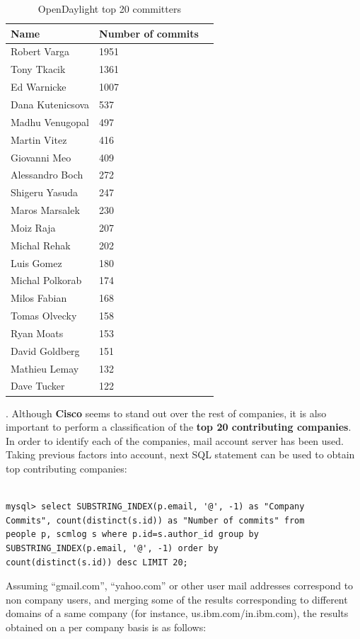 \documentclass[a4paper, 12pt]{book}
\begin{document}
\begin{table}[H]
\footnotesize
\begin{center}
\begin{tabular}{|l|l|p{3cm}|}
\hline
\textbf{Name}     & \textbf{Number of commits} \\ \hline
 Robert Varga     & 1951 \\ \hline
 Tony Tkacik      & 1361 \\ \hline
 Ed Warnicke      & 1007 \\ \hline
 Dana Kutenicsova &  537 \\ \hline
 Madhu Venugopal  &  497 \\ \hline
 Martin Vitez     &  416 \\ \hline
 Giovanni Meo     &  409 \\ \hline
 Alessandro Boch  &  272 \\ \hline
 Shigeru Yasuda   &  247 \\ \hline
 Maros Marsalek   &  230 \\ \hline
 Moiz Raja        &  207 \\ \hline
 Michal Rehak     &  202 \\ \hline
 Luis Gomez       &  180 \\ \hline
 Michal Polkorab  &  174 \\ \hline
 Milos Fabian     &  168 \\ \hline
 Tomas Olvecky    &  158 \\ \hline
 Ryan Moats       &  153 \\ \hline
 David Goldberg   &  151 \\ \hline
 Mathieu Lemay    &  132 \\ \hline
 Dave Tucker      &  122 \\ \hline
\end{tabular}
\end{center}
\caption{OpenDaylight top 20 committers}
\label{tab:odl_top_committers}
\end{table}
. Although \textbf{Cisco} seems to stand out over the rest of companies, it is also important to perform a classification of the \textbf{top 20 contributing companies}. In order to identify each of the companies, mail account server has been used. Taking previous factors into account, next SQL statement can be used to obtain top contributing companies:

\begin{verbatim}

mysql> select SUBSTRING_INDEX(p.email, '@', -1) as "Company
Commits", count(distinct(s.id)) as "Number of commits" from
people p, scmlog s where p.id=s.author_id group by
SUBSTRING_INDEX(p.email, '@', -1) order by
count(distinct(s.id)) desc LIMIT 20;

\end{verbatim}
Assuming ``gmail.com'', ``yahoo.com'' or other user mail addresses correspond to non company users, and merging some of the results corresponding to different domains of a same company (for instance, us.ibm.com/in.ibm.com), the results obtained on a per company basis is as follows:
\end{document}
